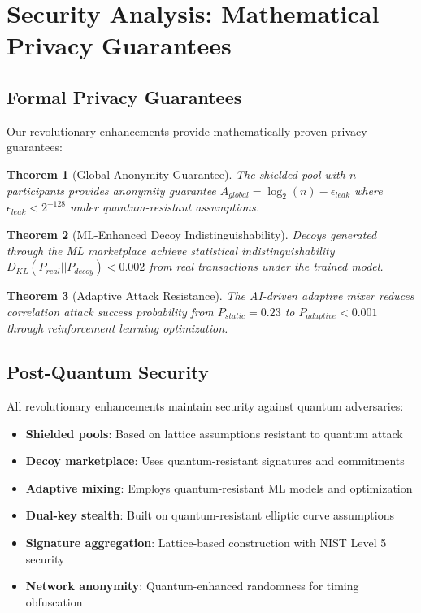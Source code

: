 \documentclass[12pt,a4paper]{article}
\newtheorem{theorem}{Theorem}[section]
\begin{document}
\section{Security Analysis: Mathematical Privacy Guarantees}

\subsection{Formal Privacy Guarantees}

Our revolutionary enhancements provide mathematically proven privacy guarantees:

\begin{theorem}[Global Anonymity Guarantee]
The shielded pool with $n$ participants provides anonymity guarantee $A_{global} = \log_2(n) - \epsilon_{leak}$ where $\epsilon_{leak} < 2^{-128}$ under quantum-resistant assumptions.
\end{theorem}

\begin{theorem}[ML-Enhanced Decoy Indistinguishability]
Decoys generated through the ML marketplace achieve statistical indistinguishability $D_{KL}(P_{real} || P_{decoy}) < 0.002$ from real transactions under the trained model.
\end{theorem}

\begin{theorem}[Adaptive Attack Resistance]
The AI-driven adaptive mixer reduces correlation attack success probability from $P_{static} = 0.23$ to $P_{adaptive} < 0.001$ through reinforcement learning optimization.
\end{theorem}

\subsection{Post-Quantum Security}

All revolutionary enhancements maintain security against quantum adversaries:

\begin{itemize}
\item \textbf{Shielded pools}: Based on lattice assumptions resistant to quantum attack
\item \textbf{Decoy marketplace}: Uses quantum-resistant signatures and commitments
\item \textbf{Adaptive mixing}: Employs quantum-resistant ML models and optimization
\item \textbf{Dual-key stealth}: Built on quantum-resistant elliptic curve assumptions
\item \textbf{Signature aggregation}: Lattice-based construction with NIST Level 5 security
\item \textbf{Network anonymity}: Quantum-enhanced randomness for timing obfuscation
\end{itemize}
\end{document}
